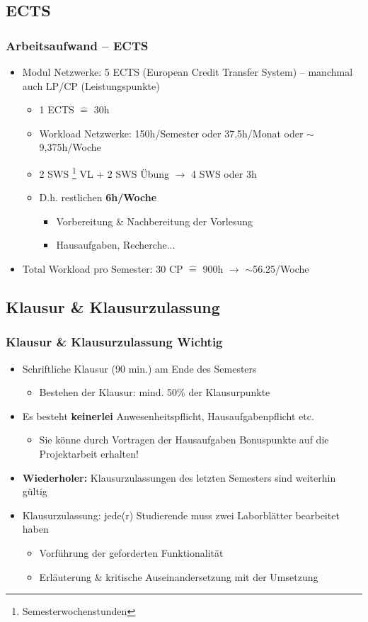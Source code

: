 \documentclass[xcolor=dvipsnames,aspectratio=169]{beamer}
\begin{document}
\subsection{ECTS}
\begin{frame}
	\frametitle{Arbeitsaufwand -- ECTS}
	\begin{itemize}
		\item Modul Netzwerke: 5 ECTS (European Credit Transfer System) -- manchmal auch LP/CP (Leistungspunkte)
			\begin{itemize}
				\item 1 ECTS $\widehat{=}$ 30h
				\item Workload Netzwerke: 150h/Semester oder 37,5h/Monat oder $\sim$ 9,375h/Woche
				\item 2 SWS \footnote{Semesterwochenstunden} VL + 2 SWS Übung $\rightarrow$ 4 SWS oder 3h
				\item D.h. restlichen \textbf{6h/Woche}
				\begin{itemize}
					\item Vorbereitung \& Nachbereitung der Vorlesung
					\item Hausaufgaben, Recherche...
				\end{itemize}
			\end{itemize}
			\item Total Workload pro Semester: 30 CP $\widehat{=}$ 900h $\rightarrow$  $\sim$56.25/Woche
	\end{itemize}
\end{frame}

\subsection{Klausur \& Klausurzulassung} \label{klausurzulassung}
\begin{frame}
	\frametitle{Klausur \& Klausurzulassung \textbf{Wichtig}}
	\begin{itemize}
		\item Schriftliche Klausur (90 min.) am Ende des Semesters 
		\begin{itemize}
			\item  Bestehen der Klausur: mind. 50\% der Klausurpunkte
		\end{itemize}
		\item Es besteht \textbf{keinerlei} Anwesenheitspflicht, Hausaufgabenpflicht etc.
		\begin{itemize}
			\item Sie könne durch Vortragen der Hausaufgaben Bonuspunkte auf die Projektarbeit erhalten!
		\end{itemize}
		\item \textbf{Wiederholer:} Klausurzulassungen des letzten Semesters sind weiterhin gültig
		\item Klausurzulassung: jede(r) Studierende muss zwei Laborblätter bearbeitet haben
		\begin{itemize}
			\item Vorführung der geforderten Funktionalität
			\item Erläuterung \& kritische Auseinandersetzung mit der Umsetzung
		\end{itemize}
	\end{itemize}
\end{frame}
\end{document}
